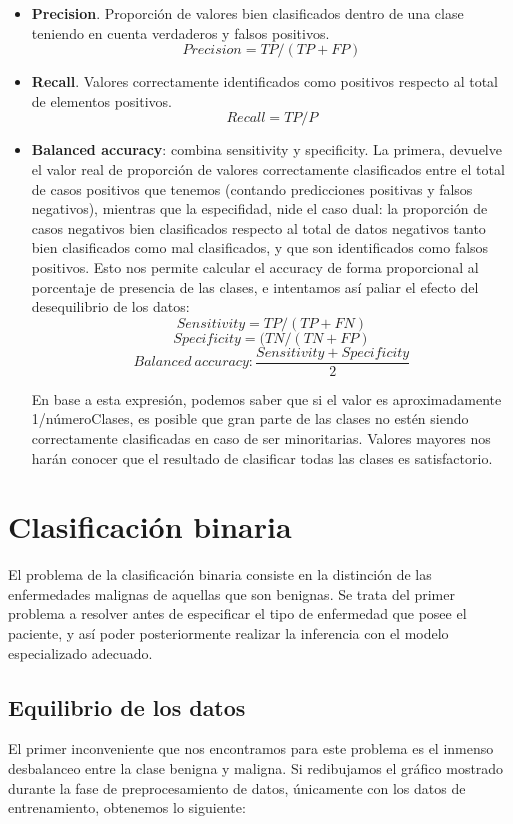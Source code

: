 \begin{itemize}
	\item  \textbf{Precision}. Proporción de valores bien clasificados dentro de una clase teniendo en cuenta verdaderos y falsos positivos. $$Precision=TP / (TP + FP)$$
	\item \textbf{Recall}. Valores correctamente identificados como positivos respecto al total de elementos positivos. $$Recall = TP / P$$
	\item  \textbf{Balanced accuracy}: combina sensitivity y specificity. La primera, devuelve el valor real de proporción de valores correctamente clasificados entre el total de casos positivos que tenemos (contando predicciones positivas y falsos negativos), mientras que la especifidad, nide el caso dual: la proporción de casos negativos bien clasificados respecto al total de datos negativos tanto bien clasificados como mal clasificados, y que son identificados como falsos positivos. Esto nos permite calcular el accuracy de forma proporcional al porcentaje de presencia de las clases, e intentamos así paliar el efecto del desequilibrio de los datos:
	$$Sensitivity = TP/(TP+FN)$$
	$$Specificity =(TN/(TN+FP)$$
$$ Balanced\ accuracy: \frac{Sensitivity + Specificity}{2}$$
	
	En base a esta expresión, podemos saber que si el valor es aproximadamente 1/númeroClases, es posible que gran parte de las clases no estén siendo correctamente clasificadas en caso de ser minoritarias. Valores mayores nos harán conocer que el resultado de clasificar todas las clases es satisfactorio.
\end{itemize}

\section{Clasificación binaria}

El problema de la clasificación binaria consiste en la distinción de las enfermedades malignas de aquellas que son benignas. Se trata del primer problema a resolver antes de especificar el tipo de enfermedad que posee el paciente, y así poder posteriormente realizar la inferencia con el modelo especializado adecuado.

\subsection{Equilibrio de los datos}

El primer inconveniente que nos encontramos para este problema es el inmenso desbalanceo entre la clase benigna y maligna. Si redibujamos el gráfico mostrado durante la fase de preprocesamiento de datos, únicamente con los datos de entrenamiento, obtenemos lo siguiente: 

